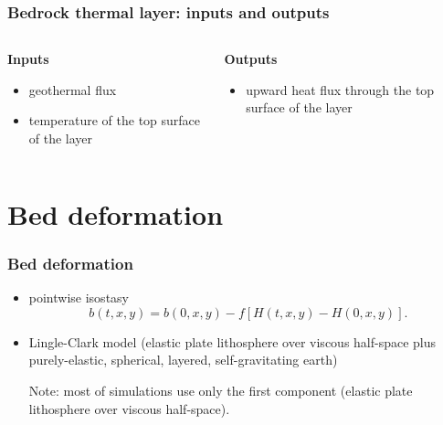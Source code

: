 \documentclass[hide notes,intlimits]{beamer}
\begin{document}

\begin{frame}
  \frametitle{Bedrock thermal layer: inputs and outputs}

  \begin{columns}[t]
    \begin{column}{0.5\linewidth}
      \textbf{Inputs}

      \begin{itemize}
      \item geothermal flux
      \item temperature of the top surface of the layer
      \end{itemize}
    \end{column}
    \begin{column}{0.5\linewidth}
      \textbf{Outputs}

      \begin{itemize}
      \item upward heat flux through the top surface of the layer
      \end{itemize}
    \end{column}
  \end{columns}
\end{frame}

\section{Bed deformation}
\label{sec:bed-deformation}

\begin{frame}
  \frametitle{Bed deformation}

  \begin{itemize}
  \item pointwise isostasy
    \begin{equation*}
      \label{eq:9}
      b(t,x,y) = b(0,x,y) - f \left[H(t,x,y) - H(0,x,y)\right].
    \end{equation*}
  \item Lingle-Clark model (elastic plate lithosphere over viscous
    half-space plus purely-elastic, spherical, layered,
    self-gravitating earth)

    \medskip
    Note: most of simulations use only the first component (elastic
    plate lithosphere over viscous half-space).
  \end{itemize}
\end{frame}
\end{document}
